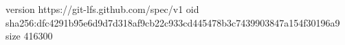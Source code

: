 version https://git-lfs.github.com/spec/v1
oid sha256:dfc4291b95e6d9d7d318af9cb22c933cd445478b3c7439903847a154f30196a9
size 416300
